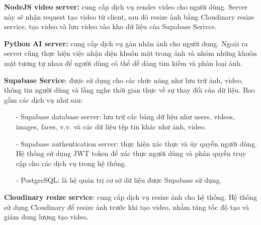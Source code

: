 \textbf{NodeJS video server:} cung cấp dịch vụ render video cho người dùng. Server này sẽ nhận request tạo video từ client, sau đó resize ảnh bằng Cloudinary resize service, tạo video và lưu video vào kho dữ liệu của Supabase Serivce. 

\textbf{Python AI server:} cung cấp dịch vụ gán nhãn ảnh cho người dung. Ngoài ra server cũng thực hiện việc nhận diện khuôn mặt trong ảnh và nhóm những khuôn mặt tương tự nhau để người dùng có thể dễ dàng tìm kiếm và phân loại ảnh. 

\textbf{Supabase Service}: được sử dụng cho các chức năng như lưu trữ ảnh, video, thông tin người dùng và lắng nghe thời gian thực về sự thay đổi của dữ liệu. Bao gồm các dịch vụ như sau:
\begin{itemize}
    \item[-] Supabase database server: lưu trữ các bảng dữ liệu như users, videos, images, faces, v.v. và các dữ liệu tệp tin khác như ảnh, video.
    \item[-] Supabase authentication server: thực hiện xác thực và ủy quyền người dùng. Hệ thống sử dụng JWT token để xác thực người dùng và phân quyền truy cập cho các dịch vụ trong hệ thống.
    \item[-] PostgreSQL: là hệ quản trị cơ sở dữ liệu được Supabase sử dụng.  
\end{itemize}

\textbf{Cloudinary resize service}: cung cấp dịch vụ resize ảnh cho hệ thống. Hệ thống sử dụng Cloudinary để resize ảnh trước khi tạo video, nhằm tăng tốc độ tạo và giảm dung lượng tạo video.
